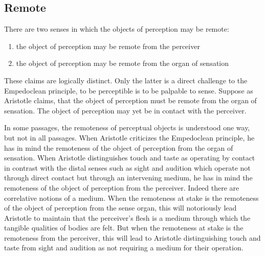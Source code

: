 
\subsection{Remote} %
\label{sub:remote}

There are two senses in which the objects of perception may be remote:
\begin{enumerate}[(1)]
	\item the object of perception may be remote from the perceiver
	\item the object of perception may be remote from the organ of sensation
\end{enumerate}
These claims are logically distinct. Only the latter is a direct challenge to the Empedoclean principle, to be perceptible is to be palpable to sense. Suppose as Aristotle claims, that the object of perception must be remote from the organ of sensation. The object of perception may yet be in contact with the perceiver.

In some passages, the remoteness of perceptual objects is understood one way, but not in all passages. When Aristotle criticizes the Empedoclean principle, he has in mind the remoteness of the object of perception from the organ of sensation. When Aristotle distinguishes touch and taste as operating by contact in contrast with the distal senses such as sight and audition which operate not through direct contact but through an intervening medium, he has in mind the remoteness of the object of perception from the perceiver. Indeed there are correlative notions of a medium. When the remoteness at stake is the remoteness of the object of perception from the sense organ, this will notoriously lead Aristotle to maintain that the perceiver's flesh is a medium through which the tangible qualities of bodies are felt. But when the remoteness at stake is the remoteness from the perceiver, this will lead to Aristotle distinguishing touch and taste from sight and audition as not requiring a medium for their operation. 

